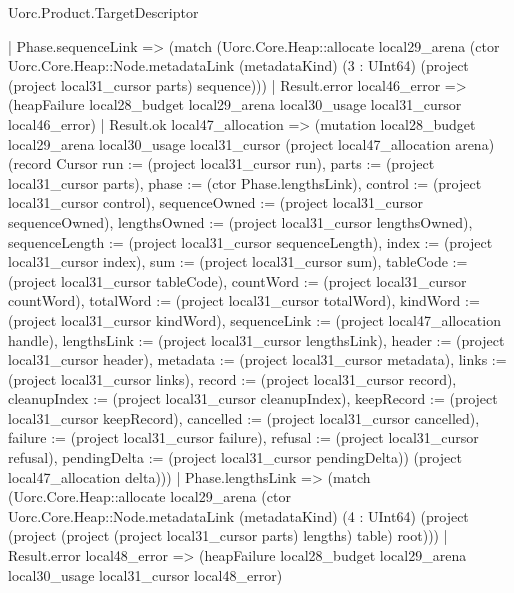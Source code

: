 \begin{lexlean}{Uorc.Product.TargetDescriptor}
\begin{semanticmodule}
{    | Phase.sequenceLink => (match (Uorc.Core.Heap::allocate local29_arena (ctor Uorc.Core.Heap::Node.metadataLink (metadataKind) (3 : UInt64) (project (project local31_cursor parts) sequence)))
      | Result.error local46_error => (heapFailure local28_budget local29_arena local30_usage local31_cursor local46_error)
      | Result.ok local47_allocation => (mutation local28_budget local29_arena local30_usage local31_cursor (project local47_allocation arena) (record Cursor {run := (project local31_cursor run), parts := (project local31_cursor parts), phase := (ctor Phase.lengthsLink), control := (project local31_cursor control), sequenceOwned := (project local31_cursor sequenceOwned), lengthsOwned := (project local31_cursor lengthsOwned), sequenceLength := (project local31_cursor sequenceLength), index := (project local31_cursor index), sum := (project local31_cursor sum), tableCode := (project local31_cursor tableCode), countWord := (project local31_cursor countWord), totalWord := (project local31_cursor totalWord), kindWord := (project local31_cursor kindWord), sequenceLink := (project local47_allocation handle), lengthsLink := (project local31_cursor lengthsLink), header := (project local31_cursor header), metadata := (project local31_cursor metadata), links := (project local31_cursor links), record := (project local31_cursor record), cleanupIndex := (project local31_cursor cleanupIndex), keepRecord := (project local31_cursor keepRecord), cancelled := (project local31_cursor cancelled), failure := (project local31_cursor failure), refusal := (project local31_cursor refusal), pendingDelta := (project local31_cursor pendingDelta)}) (project local47_allocation delta)))
    | Phase.lengthsLink => (match (Uorc.Core.Heap::allocate local29_arena (ctor Uorc.Core.Heap::Node.metadataLink (metadataKind) (4 : UInt64) (project (project (project (project local31_cursor parts) lengths) table) root)))
      | Result.error local48_error => (heapFailure local28_budget local29_arena local30_usage local31_cursor local48_error)
}
\end{semanticmodule}
\end{lexlean}
